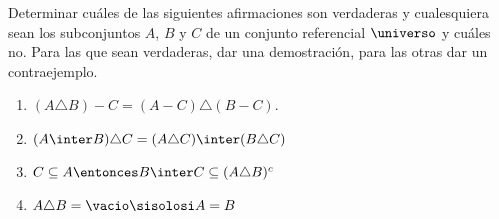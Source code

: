 \begin{enunciado}{\ejercicio}

  Determinar cuáles de las siguientes afirmaciones son verdaderas y
  cualesquiera sean los subconjuntos $A$, $B$ y $C$ de un conjunto
  referencial $\universo$ y cuáles no.
  Para las que sean verdaderas, dar una demostración, para las otras dar un contraejemplo.
  \begin{multicols}{2}
    \begin{enumerate}[label=\roman*)]
      \item $(A \triangle B) - C = (A-C) \triangle (B - C)$.
      \item $(A \inter B) \triangle C = (A \triangle C) \inter (B \triangle C)$
      \item $C \subseteq A \entonces B \inter C \subseteq (A \triangle B)^c$
      \item $A \triangle B = \vacio \sisolosi A = B$
    \end{enumerate}
  \end{multicols}

\end{enunciado}

